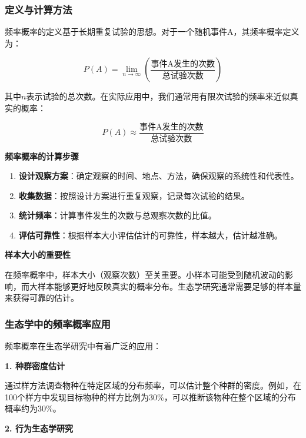 \documentclass[
]{book}
\begin{document}
\hypertarget{ux5b9aux4e49ux4e0eux8ba1ux7b97ux65b9ux6cd5}{%
\subsubsection{定义与计算方法}\label{ux5b9aux4e49ux4e0eux8ba1ux7b97ux65b9ux6cd5}}

频率概率的定义基于长期重复试验的思想。对于一个随机事件A，其频率概率定义为：

\[P(A) = \lim_{n \to \infty} \left( \frac{\text{事件A发生的次数}}{\text{总试验次数}} \right)\]

其中\(n\)表示试验的总次数。在实际应用中，我们通常用有限次试验的频率来近似真实的概率：

\[P(A) \approx \frac{\text{事件A发生的次数}}{\text{总试验次数}}\]

\textbf{频率概率的计算步骤}

\begin{enumerate}
\def\labelenumi{\arabic{enumi}.}
\item
  \textbf{设计观察方案}：确定观察的时间、地点、方法，确保观察的系统性和代表性。
\item
  \textbf{收集数据}：按照设计方案进行重复观察，记录每次试验的结果。
\item
  \textbf{统计频率}：计算事件发生的次数与总观察次数的比值。
\item
  \textbf{评估可靠性}：根据样本大小评估估计的可靠性，样本越大，估计越准确。
\end{enumerate}

\textbf{样本大小的重要性}

在频率概率中，样本大小（观察次数）至关重要。小样本可能受到随机波动的影响，而大样本能够更好地反映真实的概率分布。生态学研究通常需要足够的样本量来获得可靠的估计。

\hypertarget{ux751fux6001ux5b66ux4e2dux7684ux9891ux7387ux6982ux7387ux5e94ux7528}{%
\subsubsection{生态学中的频率概率应用}\label{ux751fux6001ux5b66ux4e2dux7684ux9891ux7387ux6982ux7387ux5e94ux7528}}

频率概率在生态学研究中有着广泛的应用：

\textbf{1. 种群密度估计}

通过样方法调查物种在特定区域的分布频率，可以估计整个种群的密度。例如，在100个样方中发现目标物种的样方比例为30\%，可以推断该物种在整个区域的分布概率约为30\%。

\textbf{2. 行为生态学研究}
\end{document}
